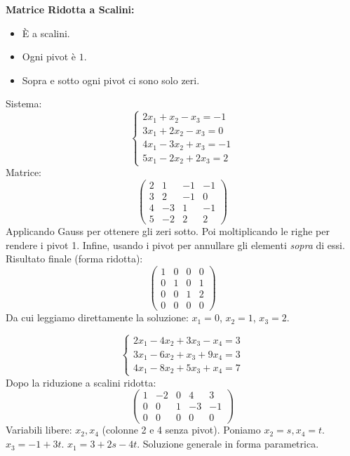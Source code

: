 \begin{definitionbox}
\textbf{Matrice Ridotta a Scalini:}
\begin{itemize}
    \item È a scalini.
    \item Ogni pivot è $1$.
    \item Sopra e sotto ogni pivot ci sono solo zeri.
\end{itemize}
\end{definitionbox}

\begin{exercisebox}[title={Esempio Gauss-Jordan}]
Sistema:
$$
\begin{cases}
2x_1 + x_2 - x_3 = -1\\
3x_1 + 2x_2 - x_3 = 0\\
4x_1 - 3x_2 + x_3 = -1\\
5x_1 - 2x_2 + 2x_3 = 2
\end{cases}
$$
Matrice:
$$ \begin{pmatrix} 2 & 1 & -1 & -1 \\ 3 & 2 & -1 & 0 \\ 4 & -3 & 1 & -1 \\ 5 & -2 & 2 & 2 \end{pmatrix} $$
Applicando Gauss per ottenere gli zeri sotto. Poi moltiplicando le righe per rendere i pivot 1. Infine, usando i pivot per annullare gli elementi \emph{sopra} di essi.
Risultato finale (forma ridotta):
$$ \begin{pmatrix} 1 & 0 & 0 & 0 \\ 0 & 1 & 0 & 1 \\ 0 & 0 & 1 & 2 \\ 0 & 0 & 0 & 0 \end{pmatrix} $$
Da cui leggiamo direttamente la soluzione:
$x_1 = 0$, $x_2 = 1$, $x_3 = 2$.
\end{exercisebox}

\begin{exercisebox}[title={Esempio con Parametri}]
$$
\begin{cases}
2x_1 - 4x_2 + 3x_3 - x_4 = 3\\
3x_1 - 6x_2 + x_3 + 9x_4 = 3\\
4x_1 - 8x_2 + 5x_3 + x_4 = 7
\end{cases}
$$
Dopo la riduzione a scalini ridotta:
$$
\begin{pmatrix}
1 & -2 & 0 & 4 & 3\\
0 & 0 & 1 & -3 & -1\\
0 & 0 & 0 & 0 & 0
\end{pmatrix}
$$
Variabili libere: $x_2, x_4$ (colonne 2 e 4 senza pivot).
Poniamo $x_2 = s, x_4 = t$.
$x_3 = -1 + 3t$.
$x_1 = 3 + 2s - 4t$.
Soluzione generale in forma parametrica.
\end{exercisebox}
